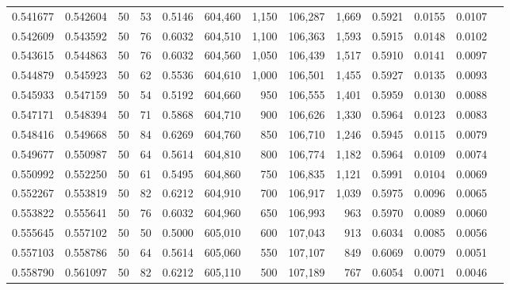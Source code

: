 \begin{tabular}{rrrrrrrrrrrrr}
0.541677 & 0.542604 &    50 &  53 &                                     0.5146 & 604,460 &   1,150 & 106,287 &   1,669 & 0.5921 & 0.0155 & 0.0107 \\
0.542609 & 0.543592 &    50 &  76 &                                     0.6032 & 604,510 &   1,100 & 106,363 &   1,593 & 0.5915 & 0.0148 & 0.0102 \\
0.543615 & 0.544863 &    50 &  76 &                                     0.6032 & 604,560 &   1,050 & 106,439 &   1,517 & 0.5910 & 0.0141 & 0.0097 \\
0.544879 & 0.545923 &    50 &  62 &                                     0.5536 & 604,610 &   1,000 & 106,501 &   1,455 & 0.5927 & 0.0135 & 0.0093 \\
0.545933 & 0.547159 &    50 &  54 &                                     0.5192 & 604,660 &     950 & 106,555 &   1,401 & 0.5959 & 0.0130 & 0.0088 \\
0.547171 & 0.548394 &    50 &  71 &                                     0.5868 & 604,710 &     900 & 106,626 &   1,330 & 0.5964 & 0.0123 & 0.0083 \\
0.548416 & 0.549668 &    50 &  84 &                                     0.6269 & 604,760 &     850 & 106,710 &   1,246 & 0.5945 & 0.0115 & 0.0079 \\
0.549677 & 0.550987 &    50 &  64 &                                     0.5614 & 604,810 &     800 & 106,774 &   1,182 & 0.5964 & 0.0109 & 0.0074 \\
0.550992 & 0.552250 &    50 &  61 &                                     0.5495 & 604,860 &     750 & 106,835 &   1,121 & 0.5991 & 0.0104 & 0.0069 \\
0.552267 & 0.553819 &    50 &  82 &                                     0.6212 & 604,910 &     700 & 106,917 &   1,039 & 0.5975 & 0.0096 & 0.0065 \\
0.553822 & 0.555641 &    50 &  76 &                                     0.6032 & 604,960 &     650 & 106,993 &     963 & 0.5970 & 0.0089 & 0.0060 \\
0.555645 & 0.557102 &    50 &  50 &                                     0.5000 & 605,010 &     600 & 107,043 &     913 & 0.6034 & 0.0085 & 0.0056 \\
0.557103 & 0.558786 &    50 &  64 &                                     0.5614 & 605,060 &     550 & 107,107 &     849 & 0.6069 & 0.0079 & 0.0051 \\
0.558790 & 0.561097 &    50 &  82 &                                     0.6212 & 605,110 &     500 & 107,189 &     767 & 0.6054 & 0.0071 & 0.0046 \\

\end{tabular}
